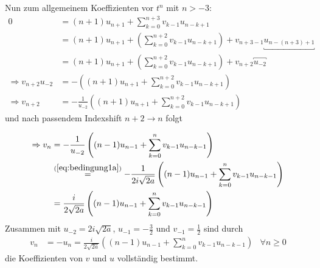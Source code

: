 Nun zum allgemeinem Koeffizienten vor $t^{n}$ mit $n>-3$:
\begin{align*}
0&= (n+1)u_{n+1} + \sum_{k=0}^{n+3} v_{k-1}u_{n-k+1}
\\&= (n+1)u_{n+1} + (\sum_{k=0}^{n+2} v_{k-1}u_{n-k+1})
  + v_{n+3-1}\underbracket{u_{n-(n+3)+1}}
\\&= (n+1)u_{n+1} + (\sum_{k=0}^{n+2} v_{k-1}u_{n-k+1}) 
  + v_{n+2}\overbracket{u_{-2}}
\\\Rightarrow v_{n+2}u_{-2}&=-\left((n+1)u_{n+1} + \sum_{k=0}^{n+2}
  v_{k-1}u_{n-k+1}\right)
\\\Rightarrow v_{n+2} &= - \frac{1}{u_{-2}}
  \left((n+1)u_{n+1} + \sum_{k=0}^{n+2} v_{k-1}u_{n-k+1}\right)
\end{align*}
und nach passendem Indexshift $n+2\rightarrow n$ folgt
\begin{comment} TODO: mapsto pfeil?  \end{comment}
\begin{align*}
\Rightarrow v_{n} &= - \frac{1}{u_{-2}}
  \left((n-1)u_{n-1} + \sum_{k=0}^{n} v_{k-1}u_{n-k-1}\right)
\\&\overset{(\ref{eq:bedingung1a})}{=} - \frac{1}{2i\sqrt{2a}}
  \left((n-1)u_{n-1} + \sum_{k=0}^{n} v_{k-1}u_{n-k-1}\right)
\\&= \frac{i}{2\sqrt{2a}}
  \left((n-1)u_{n-1} + \sum_{k=0}^{n} v_{k-1}u_{n-k-1}\right)
\end{align*}
Zusammen mit $u_{-2}=2i\sqrt{2a}$, $u_{-1}=-\frac{3}{2}$ und
$v_{-1}=\frac{1}{2}$ sind durch
\begin{align} \label{eq:induktiveFormel}
v_n &= - u_n = \frac{i}{2\sqrt{2a}}
  \left((n-1)u_{n-1} + \sum_{k=0}^{n} v_{k-1}u_{n-k-1}\right) & \forall n \geq 0
\end{align}
die Koeffizienten von $v$ und $u$ vollständig bestimmt.

